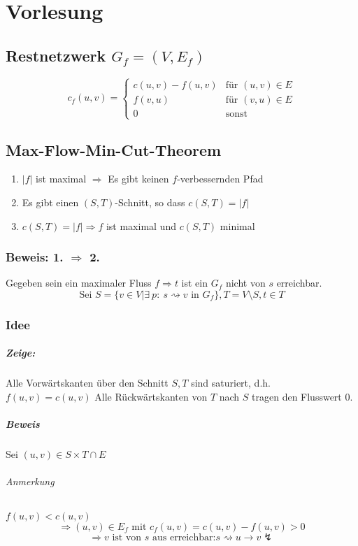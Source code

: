\chapter{Vorlesung}
\section{Restnetzwerk $G_f=(V,E_f)$}
\[ c_f(u,v)=\begin{cases}
c(u,v)-f(u,v)&\text{für }(u,v)\in E\\
f(v,u)&\text{für }(v,u)\in E\\
0 & \text{sonst}
\end{cases} \]
\section{Max-Flow-Min-Cut-Theorem}
\begin{enumerate}
	\item $|f|$ ist maximal $\Rightarrow$ Es gibt keinen $f$-verbessernden Pfad
	\item Es gibt einen $(S,T)$-Schnitt, so dass $c(S,T)=|f|$
	\item $c(S,T) = |f| \Rightarrow f$ ist maximal und $c(S,T)$ minimal
\end{enumerate}
\subsection{Beweis: 1. $\Rightarrow$ 2.}
Gegeben sein ein maximaler Fluss $f\Rightarrow  t$ ist ein $G_f$ nicht von $s$ erreichbar.
\[ \text{Sei }S=\{ v\in V | \exists~p:~s \rightsquigarrow v \text{ in } G_f \}, T=V\setminus S, t \in T \]

\subsection{Idee}
\paragraph{Zeige:} Alle Vorwärtskanten über den Schnitt $S,T$ sind saturiert, d.h. $f(u,v)=c(u,v)$ Alle Rückwärtskanten von $T$ nach $S$ tragen den Flusswert $0$.

\paragraph{Beweis}
Sei $(u,v) \in S\times T \cap E$
\subparagraph{Anmerkung} $f(u,v) < c(u,v)$
\[ \Rightarrow (u,v) \in E_f \text{ mit } c_f(u,v)=c(u,v)-f(u,v) > 0 \]
\[ \Rightarrow v \text{ ist von }s\text{ aus erreichbar:} s\rightsquigarrow u \rightarrow v \lightning \] 
\begin{align*}
\end{align*}

